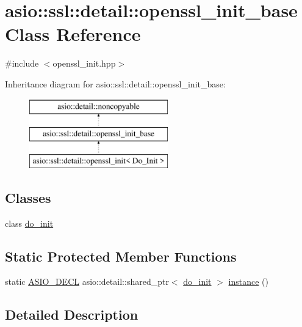 \hypertarget{classasio_1_1ssl_1_1detail_1_1openssl__init__base}{}\section{asio\+:\+:ssl\+:\+:detail\+:\+:openssl\+\_\+init\+\_\+base Class Reference}
\label{classasio_1_1ssl_1_1detail_1_1openssl__init__base}


{\ttfamily \#include $<$openssl\+\_\+init.\+hpp$>$}

Inheritance diagram for asio\+:\+:ssl\+:\+:detail\+:\+:openssl\+\_\+init\+\_\+base\+:\begin{figure}[H]
\begin{center}
\leavevmode
\includegraphics[height=3.000000cm]{classasio_1_1ssl_1_1detail_1_1openssl__init__base}
\end{center}
\end{figure}
\subsection*{Classes}
\begin{DoxyCompactItemize}
\item 
class \hyperlink{classasio_1_1ssl_1_1detail_1_1openssl__init__base_1_1do__init}{do\+\_\+init}
\end{DoxyCompactItemize}
\subsection*{Static Protected Member Functions}
\begin{DoxyCompactItemize}
\item 
static \hyperlink{config_8hpp_ab54d01ea04afeb9a8b39cfac467656b7}{A\+S\+I\+O\+\_\+\+D\+E\+C\+L} asio\+::detail\+::shared\+\_\+ptr$<$ \hyperlink{classasio_1_1ssl_1_1detail_1_1openssl__init__base_1_1do__init}{do\+\_\+init} $>$ \hyperlink{classasio_1_1ssl_1_1detail_1_1openssl__init__base_a8fee32acce29fa06c847a4bcc9e4512a}{instance} ()
\end{DoxyCompactItemize}


\subsection{Detailed Description}


